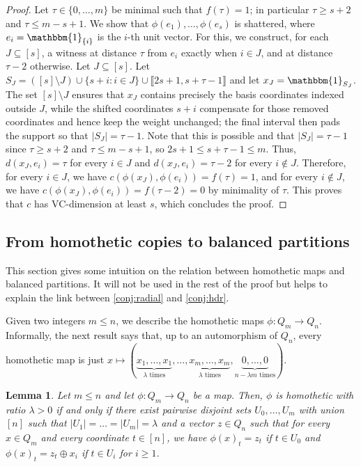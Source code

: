 \documentclass[11pt]{article}
\newtheorem{lemma}[theorem]{Lemma}
\theoremstyle{remark}
\begin{document}
\begin{proof}
Let $\tau \in \{0, \ldots, m\}$ be minimal such that $f(\tau) = 1$; in particular $\tau\geq s+2$ and $\tau \leq m-s+1$.
We show that $\phi(e_1),\ldots,\phi(e_{s})$ is shattered, where $e_i = \mathbbm{1}_{\{i\}}$ is the $i$-th unit vector.
For this, we construct, for each $J\subseteq[s]$, a witness at distance $\tau$ from $e_i$ exactly when $i\in J$, and at distance $\tau-2$ otherwise.
Let $J\subseteq[s]$.
Let $S_J = ([s] \setminus J) \cup \{s + i : i \in J\} \cup \llbracket2s+1, s+\tau-1\rrbracket$ and let $x_J = \mathbbm{1}_{S_J}$.
The set $[s]\setminus J$ ensures that $x_J$ contains precisely the basis coordinates indexed outside $J$, while the shifted coordinates $s+i$ compensate for those removed coordinates and hence keep the weight unchanged; the final interval then pads the support so that $|S_J|=\tau-1$.
Note that this is possible and that $|S_J| = \tau-1$ since $\tau\geq s+2$ and $\tau \leq m-s+1$, so $2s+1 \leq s+\tau-1 \leq m$.
Thus, $d(x_J, e_i) = \tau$ for every $i \in J$ and $d(x_J, e_i) = \tau-2$ for every $i \notin J$.
Therefore, for every $i \in J$, we have $c(\phi(x_J), \phi(e_i)) = f(\tau) = 1$, and for every $i \notin J$, we have $c(\phi(x_J), \phi(e_i)) = f(\tau-2) = 0$ by minimality of $\tau$.
This proves that $c$ has VC-dimension at least $s$, which concludes the proof.
\end{proof}

\subsection{From homothetic copies to balanced partitions}

This section gives some intuition on the relation between homothetic maps and balanced partitions. It will not be used in the rest of the proof but helps to explain the link between \cref{conj:radial} and \cref{conj:hdr}.

Given two integers $m \leq n$, we describe the homothetic maps $\phi : Q_m \to Q_n$.
Informally, the next result says that, up to an automorphism of $Q_n$, every homothetic map is just $x \mapsto (\underbrace{x_1,\ldots,x_1}_{\lambda\text{ times}},
    \ldots,
    \underbrace{x_m,\ldots,x_m}_{\lambda\text{ times}},
    \underbrace{0,\ldots,0}_{n-\lambda m\text{ times}}).$

\begin{lemma}\label{lem:form-homothetic-map}
    Let $m \leq n$ and let $\phi : Q_m \to Q_n$ be a map.
    Then, $\phi$ is homothetic with ratio $\lambda > 0$ if and only if there exist pairwise disjoint sets $U_0, \ldots, U_m$ with union $[n]$ such that $|U_1| = \ldots = |U_m| = \lambda$ and a vector $z \in Q_n$ such that for every $x \in Q_m$ and every coordinate $t \in [n]$, we have $\phi(x)_t = z_t$ if $t \in U_0$ and $\phi(x)_t = z_t \oplus x_i$ if $t \in U_i$ for $i \geq 1$.
\end{lemma}
\end{document}
